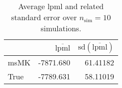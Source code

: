 \begin{table}[H]

\caption{Average lpml and related standard error over $n_{\text{sim}} = 10$ simulations.}
\centering
\begin{tabular}[t]{lrr}
\toprule
  & $\overbar{\text{lpml}}$ & $\text{sd}(\overbar{\text{lpml}})$\\
\midrule
msMK & -7871.680 & 61.41182\\
True & -7789.631 & 58.11019\\
\bottomrule
\end{tabular}
\end{table}